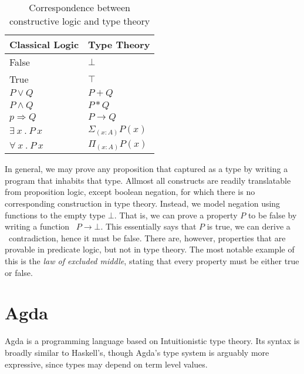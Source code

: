 \documentclass[a4paper,msc,twosized=semi]{uustthesis}
\begin{document}
\begin{table}[h]\label{tbl:chiso}
\begin{center}\begin{framed}
\begin{tabular}{ll}
\multicolumn{1}{c}{\textbf{Classical Logic}} & \textbf{Type Theory} \\ \hline \hline
False                                        & $\bot$               \\
True                                         & $\top$               \\
$P \vee Q$                                   & $P + Q$              \\
$P \wedge Q$                                 & $P * Q$              \\
$p \Rightarrow Q$                            & $P \rightarrow Q$    \\
$\exists\ x\ .\ P\ x$                        & $\Sigma_{(x : A)} P(x)$ \\
$\forall\ x\ .\ P\ x$                        & $\Pi_{(x : A)} P(x)$                   
\end{tabular}
\caption{Correspondence between constructive logic and type theory}
\end{framed}\end{center}
\end{table}

  In general, we may prove any proposition that captured as a type by writing a 
  program that inhabits that type. Allmost all constructs are readily translatable 
  from proposition logic, except boolean negation, for which there is no corresponding 
  construction in type theory. Instead, we model negation using functions to the empty 
  type $\bot$. That is, we can prove a property $P$ to be false by writing a function \
  $P \rightarrow \bot$. This essentially says that $P$ is true, we can derive a \
  contradiction, hence it must be false. There are, however, properties that are 
  provable in predicate logic, but not in type theory. The most notable example of this 
  is the \emph{law of excluded middle}, stating that every property must be either true 
  or false. 

\section{Agda}

  Agda is a programming language based on Intuitionistic type theory\cite
  {norell2008dependently}. Its syntax is broadly similar to Haskell's, though Agda's 
  type system is arguably more expressive, since types may depend on term level 
  values. 
\end{document}
